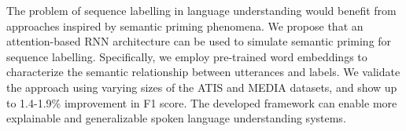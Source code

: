 The problem of sequence labelling in language understanding would benefit from approaches inspired by semantic priming phenomena. We propose that an attention-based RNN  architecture can be used to simulate semantic priming for sequence labelling. Specifically, we employ pre-trained word embeddings to characterize the semantic relationship between utterances and labels. We validate the approach using varying sizes of the ATIS and MEDIA datasets, and show up to 1.4-1.9\% improvement in F1 score. The developed framework can enable more explainable and generalizable spoken language understanding systems.
